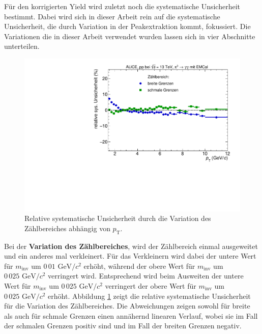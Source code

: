Für den korrigierten Yield wird zuletzt noch die systematische Unsicherheit bestimmt.
Dabei wird sich in dieser Arbeit rein auf die systematische Unsicherheit, die durch Variation in der Peakextraktion kommt, fokussiert.
Die Variationen die in dieser Arbeit verwendet wurden lassen sich in vier Abschnitte unterteilen.
\begin{figure}[t!]
\centering
\includegraphics[width=.65\linewidth]{YieldsSysUncerIntRange_Data_2016.pdf}
\caption{Relative systematische Unsicherheit durch die Variation des Zählbereiches abhängig von $p_\text{T}$.}
\label{fig:IntSys}
\end{figure}
\newline
Bei der \textbf{Variation des Zählbereiches}, wird der Zählbereich einmal ausgeweitet und ein anderes mal verkleinert.
Für das Verkleinern wird dabei der untere Wert für $m_\text{inv}$ um $0\,01 \text{ GeV}/c^{2}$ erhöht, während der obere Wert für $m_\text{inv}$ um $0\,025 \text{ GeV}/c^{2}$ verringert wird.
Entsprechend wird beim Ausweiten der untere Wert für $m_\text{inv}$ um $0\,025 \text{ GeV}/c^{2}$ verringert der obere Wert für $m_\text{inv}$ um $0\,025 \text{ GeV}/c^{2}$ erhöht.
\newline
Abbildung \ref{fig:IntSys} zeigt die relative systematische Unsicherheit für die Variation des Zählbereiches. 
Die Abweichungen zeigen sowohl für breite als auch für schmale Grenzen einen annähernd linearen Verlauf, wobei sie im Fall der schmalen Grenzen positiv sind und im Fall der breiten Grenzen negativ. 
